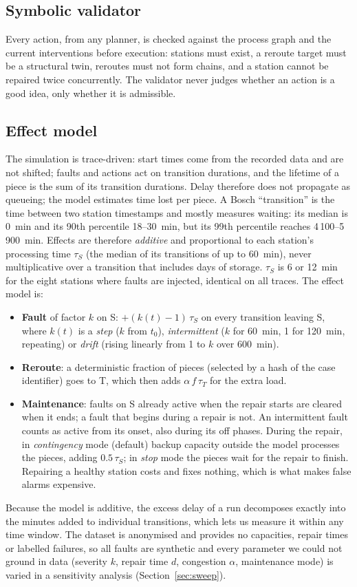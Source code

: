 \documentclass[preprint,11pt]{elsarticle}
\begin{document}
\subsection{Symbolic validator}
Every action, from any planner, is checked against the process graph and the current interventions before execution: stations must exist, a reroute target must be a structural twin, reroutes must not form chains, and a station cannot be repaired twice concurrently. The validator never judges whether an action is a good idea, only whether it is admissible.

\subsection{Effect model}
The simulation is trace-driven: start times come from the recorded data and are not shifted; faults and actions act on transition durations, and the lifetime of a piece is the sum of its transition durations. Delay therefore does not propagate as queueing; the model estimates time lost per piece. A Bosch ``transition'' is the time between two station timestamps and mostly measures waiting: its median is 0~min and its 90th percentile 18--30~min, but its 99th percentile reaches 4\,100--5\,900~min. Effects are therefore \emph{additive} and proportional to each station's processing time $\tau_S$ (the median of its transitions of up to 60~min), never multiplicative over a transition that includes days of storage. $\tau_S$ is 6 or 12~min for the eight stations where faults are injected, identical on all traces. The effect model is:
\begin{itemize}
  \item \textbf{Fault} of factor $k$ on S: $+(k(t)-1)\,\tau_S$ on every transition leaving S, where $k(t)$ is a \emph{step} ($k$ from $t_0$), \emph{intermittent} ($k$ for 60~min, 1 for 120~min, repeating) or \emph{drift} (rising linearly from 1 to $k$ over 600~min).
  \item \textbf{Reroute}: a deterministic fraction of pieces (selected by a hash of the case identifier) goes to T, which then adds $\alpha\,f\,\tau_T$ for the extra load.
  \item \textbf{Maintenance}: faults on S already active when the repair starts are cleared when it ends; a fault that begins during a repair is not. An intermittent fault counts as active from its onset, also during its off phases. During the repair, in \emph{contingency} mode (default) backup capacity outside the model processes the pieces, adding $0.5\,\tau_S$; in \emph{stop} mode the pieces wait for the repair to finish. Repairing a healthy station costs and fixes nothing, which is what makes false alarms expensive.
\end{itemize}
Because the model is additive, the excess delay of a run decomposes exactly into the minutes added to individual transitions, which lets us measure it within any time window. The dataset is anonymised and provides no capacities, repair times or labelled failures, so all faults are synthetic and every parameter we could not ground in data (severity $k$, repair time $d$, congestion $\alpha$, maintenance mode) is varied in a sensitivity analysis (Section~\ref{sec:sweep}).
\end{document}
